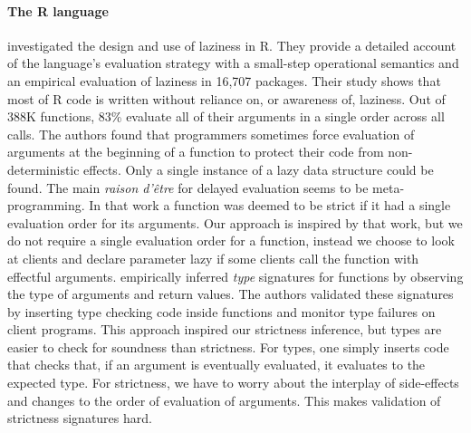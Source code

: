 \documentclass[review,nonacm,screen,acmsmall,anonymous=true]{acmart}
\begin{document}
\paragraph{The R language} \citet{oopsla19b} investigated the design and use of
laziness in R. They provide a detailed account of the language's evaluation
strategy with a small-step operational semantics and an empirical evaluation of
laziness in 16,707 packages. Their study shows that most of R code is written
without reliance on, or awareness of, laziness. Out of 388K functions, 83\%
evaluate all of their arguments in a single order across all calls. The authors
found that programmers sometimes force evaluation of arguments at the beginning
of a function to protect their code from non-deterministic effects. Only a
single instance of a lazy data structure could be found. The main \emph{raison
d'\^etre} for delayed evaluation seems to be meta-programming. In that work a
function was deemed to be strict if it had a single evaluation order for its
arguments. Our approach is inspired by that work, but we do not require a single
evaluation order for a function, instead we choose to look at clients and
declare parameter lazy if some clients call the function with effectful
arguments. \citet{oopsla20b} empirically inferred \emph{type} signatures for
functions by observing the type of arguments and return values. The authors
validated these signatures by inserting type checking code inside functions and
monitor type failures on client programs. This approach inspired our strictness
inference, but types are easier to check for soundness than strictness. For
types, one simply inserts code that checks that, if an argument is eventually
evaluated, it evaluates to the expected type. For strictness, we have to worry
about the interplay of side-effects and changes to the order of evaluation of
arguments. This makes validation of strictness signatures hard.
\end{document}
